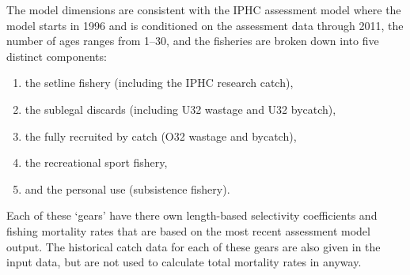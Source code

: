 The model dimensions are consistent with the IPHC assessment model where the model starts in 1996 and is conditioned on the assessment data through 2011, the number of ages ranges from 1--30, and the fisheries are broken down into five distinct components: 
\begin{enumerate}
	\item the setline fishery (including the IPHC research catch),
	\item the sublegal discards (including U32 wastage and U32 bycatch),
	\item the fully recruited by catch (O32 wastage and bycatch),
	\item the recreational sport fishery,
	\item and the personal use (subsistence fishery).
\end{enumerate}
Each of these `gears' have there own length-based selectivity coefficients and fishing mortality rates that are based on the most recent assessment model output.  The historical catch data for each of these gears are also given in the input data, but are not used to calculate total mortality rates in anyway.  




